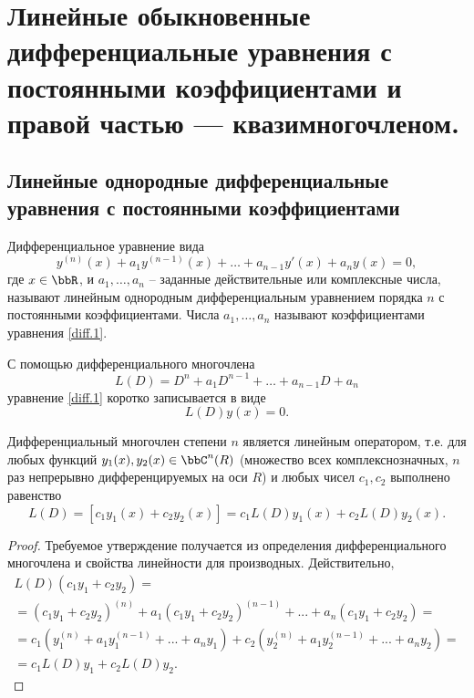 \chapter{Линейные обыкновенные дифференциальные уравнения с постоянными коэффициентами и правой частью — квазимногочленом.}

\section{Линейные однородные дифференциальные уравнения с постоянными коэффициентами}

Дифференциальное уравнение вида
\begin{equation}\label{diff.1}
y^{(n)}(x)+a_1y^{(n-1)}(x)+\dots+a_{n-1}y'(x)+a_ny(x)=0,
\end{equation}
где $x\in \bbR$, и $a_1,\dots,a_n$ -- заданные действительные или комплексные числа, называют линейным однородным дифференциальным уравнением порядка $n$ с постоянными коэффициентами. Числа $a_1,\dots,a_n$ называют коэффициентами уравнения \eqref{diff.1}.

С помощью дифференциального многочлена 
$$
L(D)= D^n+a_1D^{n-1}+\dots+a_{n-1}D+a_n
$$
уравнение \eqref{diff.1} коротко записывается в виде 
\begin{equation} \label{diff.2}
L(D)y(x)=0.
\end{equation}

\begin{lemm} \label{lemm1.1}
Дифференциальный многочлен степени $n$ является линейным оператором, т.е. для любых функций $y_1(x),y_2(x)\in \bbC^n(R)$ (множество всех комплекснозначных, $n$ раз непрерывно дифференцируемых на оси $R$) и любых чисел $c_1,c_2$ выполнено равенство
$$
L(D)=[c_1y_1(x)+c_2y_2(x)]=c_1L(D)y_1(x)+c_2L(D)y_2(x).
$$ 
\end{lemm}

\begin{proof}
Требуемое утверждение получается из определения дифференциального многочлена и свойства линейности для производных. Действительно,
\begin{multline*}
L(D)(c_1y_1+c_2y_2)=\\=(c_1y_1+c_2y_2)^{(n)}+a_1(c_1y_1+c_2y_2)^{(n-1)}+...+a_n(c_1y_1+c_2y_2)=\\=c_1(y_1^{(n)}+a_1y_1^{(n-1)}+...+a_ny_1)+c_2(y_2^{(n)}+a_1y_2^{(n-1)}+...+a_ny_2)=\\=c_1L(D)y_1+c_2L(D)y_2.
\end{multline*}
\end{proof}

